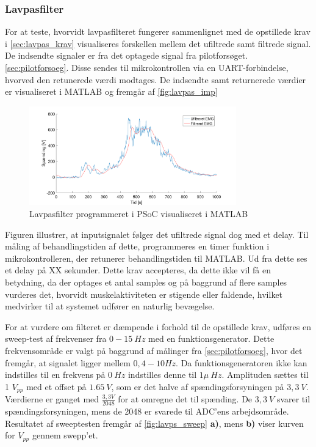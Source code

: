 \subsubsection{Lavpasfilter}
For at teste, hvorvidt lavpasfilteret fungerer sammenlignet med de opstillede krav i \autoref{sec:lavpas_krav} visualiseres forskellen mellem det ufiltrede samt filtrede signal. 
De indsendte signaler er fra det optagede signal fra pilotforsøget. \autoref{sec:pilotforsoeg}. Disse sendes til mikrokontrollen via en UART-forbindelse, hvorved den retunerede værdi modtages. De indsendte samt returnerede værdier er visualiseret i MATLAB og fremgår af \autoref{fig:lavpas_imp}

\begin{figure}[H]
\centering
\includegraphics[width=0.8\textwidth]{figures/EMG_test}
\caption{Lavpasfilter programmeret i PSoC visualiseret i MATLAB}
\label{fig:lavpas_imp}
\end{figure}

\noindent
Figuren illustrer, at inputsignalet følger det ufiltrede signal dog med et delay. Til måling af behandlingstiden af dette, programmeres en timer funktion i mikrokontrolleren, der retunerer behandlingstiden til MATLAB. Ud fra dette ses et delay på XX sekunder. Dette krav accepteres, da dette ikke vil få en betydning, da der optages et antal samples og på baggrund af flere samples vurderes det, hvorvidt muskelaktiviteten er stigende eller faldende, hvilket medvirker til at systemet udfører en naturlig bevægelse.


For at vurdere om filteret er dæmpende i forhold til de opstillede krav, udføres en sweep-test af frekvenser fra $0-15~Hz$ med en funktionsgenerator. Dette frekvensområde er valgt på baggrund af målinger fra \autoref{sec:pilotforsoeg}, hvor det fremgår, at signalet ligger mellem $0,4-10Hz$.  Da funktionsgeneratoren ikke kan indstilles til en frekvens på $0~Hz$ indstilles denne til $1 \mu~Hz$. Amplituden sættes til 1 $V_{pp}$ med et offset på $1.65~V$, som er det halve af spændingsforsyningen på $3,3~V$. Værdierne er ganget med $\frac{3,3V}{2048}$ for at omregne det til spænding. De $3,3~V$ svarer til spændingsforsyningen, mens de 2048 er svarede til ADC'ens arbejdsområde. Resultatet af sweeptesten fremgår af \autoref{fig:lavps_sweep} \textbf{a)}, mens \textbf{b)} viser kurven for $V_{pp}$ gennem swepp'et.

